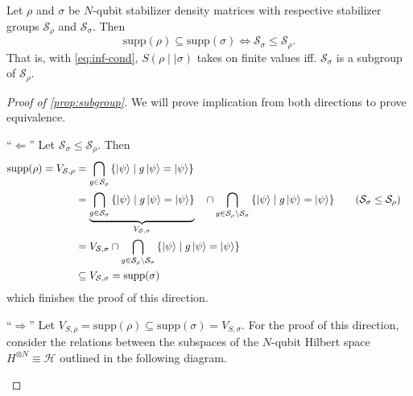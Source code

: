 \begin{thm}\label{prop:subgroup}
  Let $\rho$ and $\sigma$ be $N$-qubit stabilizer density matrices with
  respective stabilizer groups $\mathcal{S}_\rho$ and $\mathcal{S}_\sigma$. Then
  \[ \mathrm{supp}(\rho)\subseteq \mathrm{supp}(\sigma) \Longleftrightarrow
  \mathcal{S}_\sigma \leq \mathcal{S}_\rho. \]
  That is, with \cref{eq:inf-cond}, $S(\rho\mid\mid\sigma)$ takes on finite
  values iff. $\mathcal{S}_\sigma$ is a
  subgroup of $\mathcal{S}_\rho$.
\end{thm}

\begin{proof}[Proof of \cref{prop:subgroup}]
  We will prove implication from both directions to prove equivalence.

  \enquote{$\Leftarrow$} Let $\mathcal{S}_\sigma \leq \mathcal{S}_\rho$. Then
  \begin{alignat*}{2}
    \mathrm{supp}(\rho) = V_{\mathcal{S},\rho} &= \bigcap_{g\in \mathcal{S}_\rho} \left\{ \ket{\psi} \mid
    g\ket{\psi} = \ket{\psi} \right\} \\
        &= \underbrace{\bigcap_{g\in \mathcal{S}_\sigma}
        \left\{\ket{\psi} \mid g \ket{\psi} =
        \ket{\psi}\right\}}_{V_{\mathcal{S},\sigma}}\ \ \ \cap \bigcap_{g \in \mathcal{S}_\rho \setminus
        \mathcal{S}_\sigma} \left\{\ket{\psi} \mid g \ket{\psi} =
    \ket{\psi}\right\} &&\quad{(\mathcal{S}_\sigma \leq \mathcal{S}_\rho)}\\
        &= V_{\mathcal{S},\sigma} \cap \bigcap_{g \in \mathcal{S}_\rho \setminus
        \mathcal{S}_\sigma} \left\{\ket{\psi} \mid g \ket{\psi} =
        \ket{\psi}\right\}\\
        &\subseteq V_{\mathcal{S},\sigma} = \mathrm{supp}(\sigma)
  \end{alignat*}
  which finishes the proof of this direction.

  \enquote{$\Rightarrow$} Let $V_{S,\rho} = \mathrm{supp}(\rho) \subseteq
  \mathrm{supp}(\sigma) = V_{S,\sigma}$. 
  For the proof of this direction, consider the relations between the subspaces
  of the $N$-qubit Hilbert space $H^{\otimes N}\equiv\mathcal{H}$ outlined in the following
  diagram.
  \begin{figure}[H]
    \centering
\end{figure}


\end{proof}
